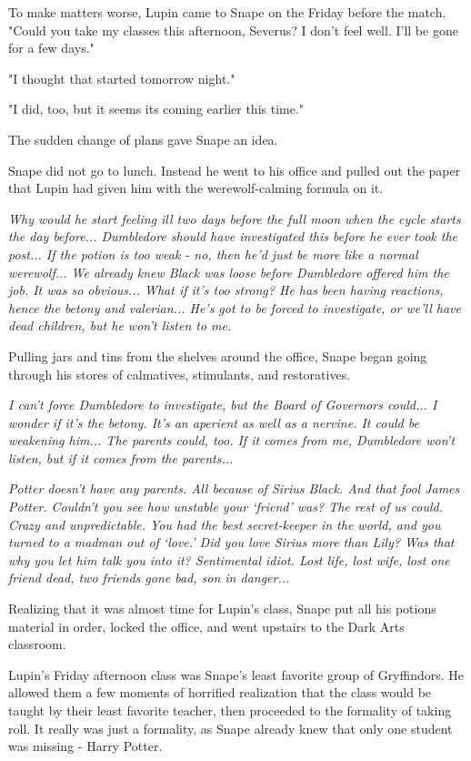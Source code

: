 To make matters worse, Lupin came to Snape on the Friday before the match. "Could you take my classes this afternoon, Severus? I don't feel well. I'll be gone for a few days."

"I thought that started tomorrow night."

"I did, too, but it seems its coming earlier this time."

The sudden change of plans gave Snape an idea.

Snape did not go to lunch. Instead he went to his office and pulled out the paper that Lupin had given him with the werewolf-calming formula on it.

\emph{Why would he start feeling ill two days before the full moon when the cycle starts the day before... Dumbledore should have investigated this before he ever took the post... If the potion is too weak - no, then he'd just be more like a normal werewolf... We already knew Black was loose before Dumbledore offered him the job. It was so obvious... What if it's too strong? He has been having reactions, hence the betony and valerian... He's got to be forced to investigate, or we'll have dead children, but he won't listen to me.}

Pulling jars and tins from the shelves around the office, Snape began going through his stores of calmatives, stimulants, and restoratives.

\emph{I can't force Dumbledore to investigate, but the Board of Governors could... I wonder if it's the betony. It's an aperient as well as a nervine. It could be weakening him... The parents could, too. If it comes from me, Dumbledore won't listen, but if it comes from the parents...}

\emph{Potter doesn't have any parents. All because of Sirius Black. And that fool James Potter. Couldn't you see how unstable your `friend' was? The rest of us could. Crazy and unpredictable. You had the best secret-keeper in the world, and you turned to a madman out of `love.' Did you love Sirius more than Lily? Was that why you let him talk you into it? Sentimental idiot. Lost life, lost wife, lost one friend dead, two friends gone bad, son in danger...}

Realizing that it was almost time for Lupin's class, Snape put all his potions material in order, locked the office, and went upstairs to the Dark Arts classroom.

Lupin's Friday afternoon class was Snape's least favorite group of Gryffindors. He allowed them a few moments of horrified realization that the class would be taught by their least favorite teacher, then proceeded to the formality of taking roll. It really was just a formality, as Snape already knew that only one student was missing - Harry Potter.

